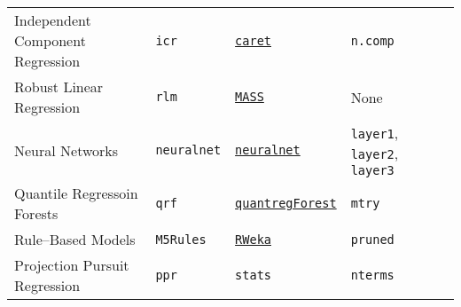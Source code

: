\documentclass[12pt]{article}
\begin{document}
\begin{landscape}
\begin{longtable}{lllll}
\rowcolor[rgb]{.95, .95, .95}   
       Independent Component Regression&
         \texttt{icr} & 
             {\tt \href{http://cran.r-project.org/web/packages/caret/index.html}{caret}}      & 
            \texttt{n.comp}  \\              
           
                
      Robust Linear Regression &
         \texttt{rlm} & 
             {\tt \href{http://cran.r-project.org/web/packages/MASS/index.html}{MASS}}       & 
            None \\              
            
\rowcolor[rgb]{.95, .95, .95}              
      Neural Networks &
         \texttt{neuralnet} & 
             {\tt \href{http://cran.r-project.org/web/packages/neuralnet/index.html}{neuralnet}}       & 
            \texttt{layer1},  \texttt{layer2}, \texttt{layer3}\\         
              
      Quantile Regressoin Forests &
         \texttt{qrf} & 
             {\tt \href{http://cran.r-project.org/web/packages/quantregForest/index.html}{quantregForest}}       & 
            \texttt{mtry}\\                 
                   
 \rowcolor[rgb]{.95, .95, .95}   
      Rule--Based Models &
         \texttt{M5Rules} & 
            {\tt \href{http://cran.r-project.org/web/packages/RWeka/index.html}{RWeka}}    & 
            \texttt{pruned}  \\             


      Projection Pursuit Regression  &
         \texttt{ppr} & 
            \texttt{stats}       & 
            \texttt{nterms} \\            
         

\end{longtable}
\end{landscape}
\end{document}
